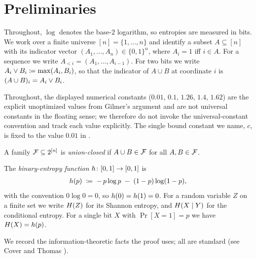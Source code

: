 \section{Preliminaries}
\label{sec:prelim}

Throughout, $\log$ denotes the base-$2$ logarithm, so entropies are measured in
bits. We work over a finite universe $[n] = \{1,\dots,n\}$ and identify a subset
$A \subseteq [n]$ with its indicator vector $(A_1,\dots,A_n) \in \{0,1\}^n$,
where $A_i = 1$ iff $i \in A$. For a sequence we write $A_{<i} = (A_1,\dots,A_{i-1})$.
For two bits we write $A_i \vee B_i \coloneqq \max(A_i, B_i)$, so that the
indicator of $A \cup B$ at coordinate $i$ is $(A \cup B)_i = A_i \vee B_i$.

Throughout, the displayed numerical constants ($0.01$, $0.1$, $1.26$, $1.4$,
$1.62$) are the explicit unoptimized values from Gilmer's argument and are not
universal constants in the floating sense; we therefore do not invoke the
universal-constant convention and track each value explicitly. The single bound
constant we name, $c$, is fixed to the value $0.01$ in .

\begin{definition}
\label{def:union-closed}
A family $\mathcal{F} \subseteq 2^{[n]}$ is \emph{union-closed} if $A \cup B \in \mathcal{F}$ for
all $A, B \in \mathcal{F}$.
\end{definition}

\begin{definition}
\label{def:binary-entropy}
The \emph{binary-entropy function} $h \colon [0,1] \to [0,1]$ is
\begin{align*}
h(p) \;\coloneqq\; -\,p \log p \;-\; (1-p)\log(1-p),
\end{align*}
with the convention $0 \log 0 = 0$, so $h(0) = h(1) = 0$. For a random
variable $Z$ on a finite set we write $H(Z)$ for its Shannon entropy, and
$H(X \mid Y)$ for the conditional entropy. For a single bit $X$ with
$\Pr[X=1] = p$ we have $H(X) = h(p)$.
\end{definition}

We record the information-theoretic facts the proof uses; all are standard
(see Cover and Thomas \cite{coverthomas2006}).

